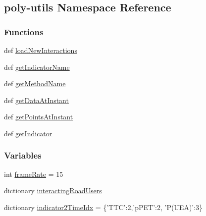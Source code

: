 \hypertarget{namespacepoly-utils}{\subsection{poly-\/utils Namespace Reference}
\label{namespacepoly-utils}
}
\subsubsection*{Functions}
\begin{DoxyCompactItemize}
\item 
def \hyperlink{namespacepoly-utils_a60efdaca1080b0d32d58bdc6d435d133}{load\-New\-Interactions}
\item 
def \hyperlink{namespacepoly-utils_a49efcbf137da6572ebc75f06d4512a96}{get\-Indicator\-Name}
\item 
def \hyperlink{namespacepoly-utils_a49869f8abcbf1f79e67fc28df7cc3859}{get\-Method\-Name}
\item 
def \hyperlink{namespacepoly-utils_a1cd891e846eab48097b552c38a7c7a82}{get\-Data\-At\-Instant}
\item 
def \hyperlink{namespacepoly-utils_a0b1a2783fe6ce5e4b9e02c30074e7405}{get\-Points\-At\-Instant}
\item 
def \hyperlink{namespacepoly-utils_a266b8380e78ab7072f8660f1c2535faf}{get\-Indicator}
\end{DoxyCompactItemize}
\subsubsection*{Variables}
\begin{DoxyCompactItemize}
\item 
int \hyperlink{namespacepoly-utils_afd6fd6883ca01f5c35efbd65a12e4ac1}{frame\-Rate} = 15
\item 
dictionary \hyperlink{namespacepoly-utils_adf6aa542a17dc9d5d13a19e44c9425c0}{interacting\-Road\-Users}
\item 
dictionary \hyperlink{namespacepoly-utils_a0e845d97dbbcae36f39bd832c890ad7a}{indicator2\-Time\-Idx} = \{'T\-T\-C'\-:2,'p\-P\-E\-T'\-:2, 'P(U\-E\-A)'\-:3\}
\end{DoxyCompactItemize}


